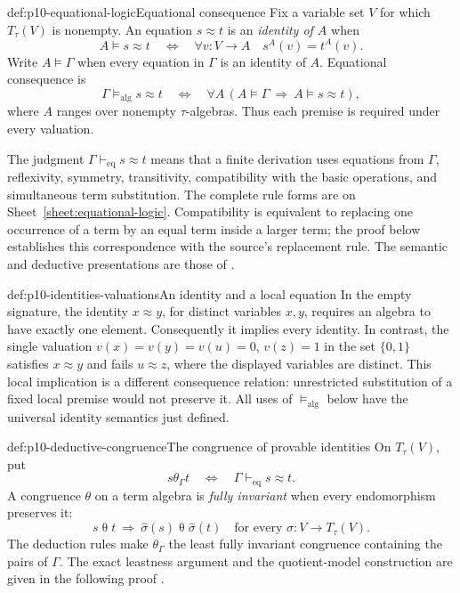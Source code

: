 \begin{hbdefinition}{def:p10-equational-logic}{Equational consequence}
Fix a variable set \(V\) for which \(T_\tau(V)\) is nonempty.
An equation \(s\approx t\) is an \emph{identity of \(A\)} when
\[
 A\models s\approx t
 \quad\Longleftrightarrow\quad
 \forall v:V\to A\quad s^A(v)=t^A(v).
\]
Write \(A\models\Gamma\) when every equation in \(\Gamma\) is an
identity of \(A\). Equational consequence is
\[
 \Gamma\models_{\mathrm{alg}}s\approx t
 \quad\Longleftrightarrow\quad
 \forall A\,
 (A\models\Gamma\ \Longrightarrow\ A\models s\approx t),
\]
where \(A\) ranges over nonempty \(\tau\)-algebras.
Thus each premise is required under every valuation.

The judgment \(\Gamma\vdash_{\mathrm{eq}}s\approx t\) means that a
finite derivation uses equations from \(\Gamma\), reflexivity,
symmetry, transitivity, compatibility with the basic operations,
and simultaneous term substitution. The complete rule forms are on
Sheet~\ref{sheet:equational-logic}.
Compatibility is equivalent to replacing one occurrence of a term
by an equal term inside a larger term; the proof below establishes
this correspondence with the source's replacement rule.
The semantic and deductive presentations are those of
\cite[II\S11, Definition~11.1; II\S14, Definitions~14.11,
14.16, 14.18]{BurrisSankappanavar2012}.
\end{hbdefinition}


\begin{hbexample}{def:p10-identities-valuations}{An identity and a local equation}
In the empty signature, the identity \(x\approx y\), for distinct
variables \(x,y\), requires an algebra to have exactly one element.
Consequently it implies every identity.
In contrast, the single valuation \(v(x)=v(y)=v(u)=0\), \(v(z)=1\)
in the set \(\{0,1\}\) satisfies \(x\approx y\) and fails
\(u\approx z\), where the displayed variables are distinct.
This local implication is a different consequence relation:
unrestricted substitution of a fixed local premise would not preserve it.
All uses of \(\models_{\mathrm{alg}}\) below have the universal
identity semantics just defined.
\end{hbexample}

\begin{hbdefinition}{def:p10-deductive-congruence}{The congruence of provable identities}
On \(T_\tau(V)\), put
\[
 s\mathrel{\theta_\Gamma}t
 \quad\Longleftrightarrow\quad
 \Gamma\vdash_{\mathrm{eq}}s\approx t.
\]
A congruence \(\theta\) on a term algebra is \emph{fully invariant}
when every endomorphism preserves it:
\[
 s\mathrel\theta t\ \Longrightarrow\
 \widehat\sigma(s)\mathrel\theta\widehat\sigma(t)
 \quad\text{for every }\sigma:V\to T_\tau(V).
\]
The deduction rules make \(\theta_\Gamma\) the least fully invariant
congruence containing the pairs of \(\Gamma\).
The exact leastness argument and the quotient-model construction are
given in the following proof
\cite[II\S14, Theorems~14.12 and~14.17]{BurrisSankappanavar2012}.
\index{congruence!fully invariant}
\end{hbdefinition}

